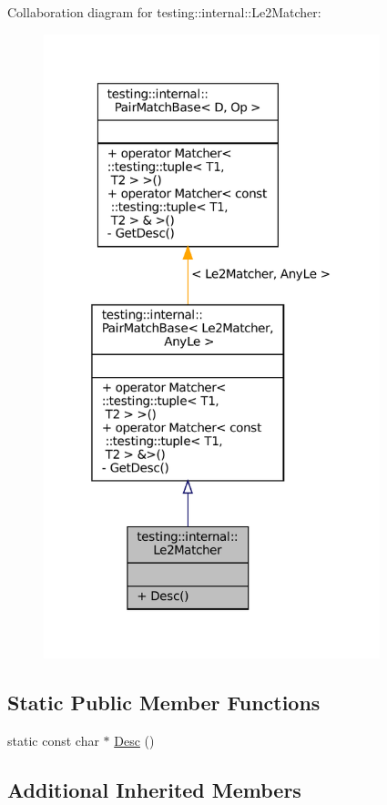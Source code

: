 Collaboration diagram for testing\+:\+:internal\+:\+:Le2\+Matcher\+:
\nopagebreak
\begin{figure}[H]
\begin{center}
\leavevmode
\includegraphics[width=277pt]{classtesting_1_1internal_1_1Le2Matcher__coll__graph}
\end{center}
\end{figure}
\subsection*{Static Public Member Functions}
\begin{DoxyCompactItemize}
\item 
static const char $\ast$ \hyperlink{classtesting_1_1internal_1_1Le2Matcher_a92e2aca3f09bb687895b10c272cb392f}{Desc} ()
\end{DoxyCompactItemize}
\subsection*{Additional Inherited Members}


